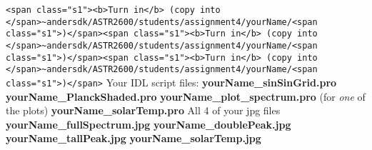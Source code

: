 \documentclass{article}
\begin{document}
\begin{spacing}{1.0}
\verb|<span class="s1"><b>Turn in</b> (copy into </span>~andersdk/ASTR2600/students/assignment4/yourName/<span class="s1">)</span>|\verb|<span class="s1"><b>Turn in</b> (copy into </span>~andersdk/ASTR2600/students/assignment4/yourName/<span class="s1">)</span>|\verb|<span class="s1"><b>Turn in</b> (copy into </span>~andersdk/ASTR2600/students/assignment4/yourName/<span class="s1">)</span>|
Your IDL script files: 
\textbf{yourName_sinSinGrid.pro}
\textbf{yourName_PlanckShaded.pro}
\textbf{yourName_plot_spectrum.pro} (for \emph{one} of the plots)
\textbf{yourName_solarTemp.pro}
All 4 of your jpg files
\textbf{yourName_fullSpectrum.jpg}
\textbf{yourName_doublePeak.jpg}
\textbf{yourName_tallPeak.jpg}
\textbf{yourName_solarTemp.jpg}


\end{spacing}
\end{document}

